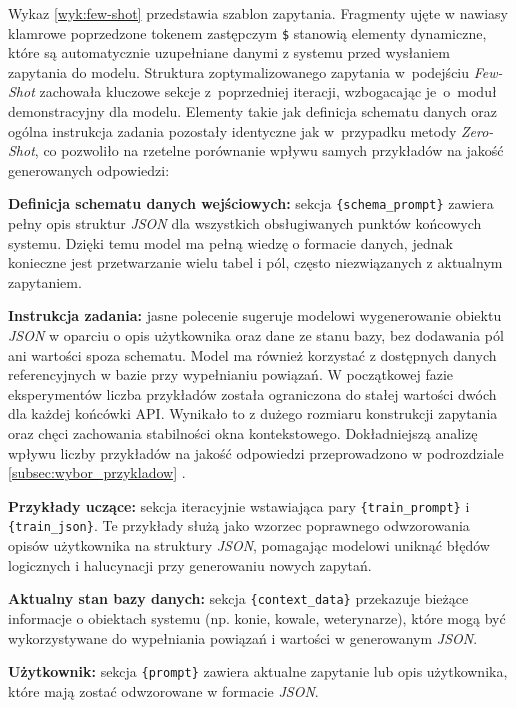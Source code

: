 Wykaz \ref{wyk:few-shot} przedstawia szablon zapytania. Fragmenty ujęte w nawiasy klamrowe poprzedzone tokenem zastępczym \texttt{\$} stanowią elementy dynamiczne, które są automatycznie uzupełniane danymi z systemu przed wysłaniem zapytania do modelu. Struktura zoptymalizowanego zapytania w~podejściu \textit{Few-Shot} zachowała kluczowe sekcje z~poprzedniej iteracji, wzbogacając je~o~moduł demonstracyjny dla modelu. Elementy takie jak definicja schematu danych oraz ogólna instrukcja zadania pozostały identyczne jak w~przypadku metody \textit{Zero-Shot}, co pozwoliło na rzetelne porównanie wpływu samych przykładów na jakość generowanych odpowiedzi:

\begin{description}
    \item \textbf{Definicja schematu danych wejściowych:} sekcja \texttt{\{schema\_prompt\}} zawiera pełny opis struktur \textit{JSON} dla wszystkich obsługiwanych punktów końcowych systemu. Dzięki temu model ma pełną wiedzę o formacie danych, jednak konieczne jest przetwarzanie wielu tabel i pól, często niezwiązanych z aktualnym zapytaniem.
    \item \textbf{Instrukcja zadania:} jasne polecenie sugeruje modelowi wygenerowanie obiektu \textit{JSON} w oparciu o opis użytkownika oraz dane ze stanu bazy, bez dodawania pól ani wartości spoza schematu. Model ma również korzystać z dostępnych danych referencyjnych w bazie przy wypełnianiu powiązań. W początkowej fazie eksperymentów liczba przykładów została ograniczona do stałej wartości dwóch dla każdej końcówki API. Wynikało to z dużego rozmiaru konstrukcji zapytania oraz chęci zachowania stabilności okna kontekstowego. Dokładniejszą analizę wpływu liczby przykładów na jakość odpowiedzi przeprowadzono w podrozdziale \ref{subsec:wybor_przykladow} .
    \item \textbf{Przykłady uczące:} sekcja iteracyjnie wstawiająca pary \texttt{\{train\_prompt\}} i \texttt{\{train\_json\}}. Te przykłady służą jako wzorzec poprawnego odwzorowania opisów użytkownika na struktury \textit{JSON}, pomagając modelowi uniknąć błędów logicznych i halucynacji przy generowaniu nowych zapytań.
    \item \textbf{Aktualny stan bazy danych:} sekcja \texttt{\{context\_data\}} przekazuje bieżące informacje o obiektach systemu (np. konie, kowale, weterynarze), które mogą być wykorzystywane do wypełniania powiązań i wartości w generowanym \textit{JSON}.
    \item \textbf{Użytkownik:} sekcja \texttt{\{prompt\}} zawiera aktualne zapytanie lub opis użytkownika, które mają zostać odwzorowane w formacie \textit{JSON}.
\end{description}

